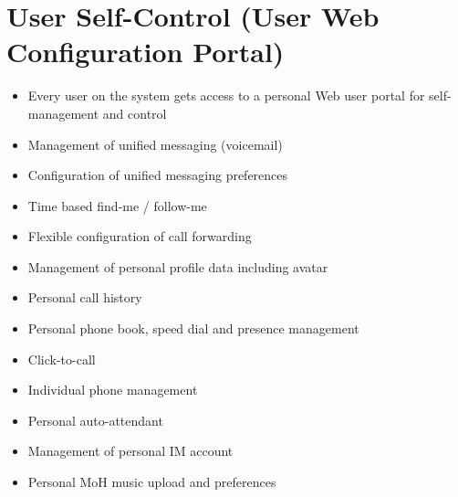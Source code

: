 \documentclass[letterpaper,10pt,english]{sphinxmanual}
\begin{document}
\section{User Self-Control (User Web Configuration Portal)}
\label{\detokenize{features:user-self-control-user-web-configuration-portal}}\begin{itemize}
\item {} 
Every user on the system gets access to a personal Web user portal for self-management and control

\item {} 
Management of unified messaging (voicemail)

\item {} 
Configuration of unified messaging preferences

\item {} 
Time based find-me / follow-me

\item {} 
Flexible configuration of call forwarding

\item {} 
Management of personal profile data including avatar

\item {} 
Personal call history

\item {} 
Personal phone book, speed dial and presence management

\item {} 
Click-to-call

\item {} 
Individual phone management

\item {} 
Personal auto-attendant

\item {} 
Management of personal IM account

\item {} 
Personal MoH music upload and preferences

\end{itemize}
\end{document}
